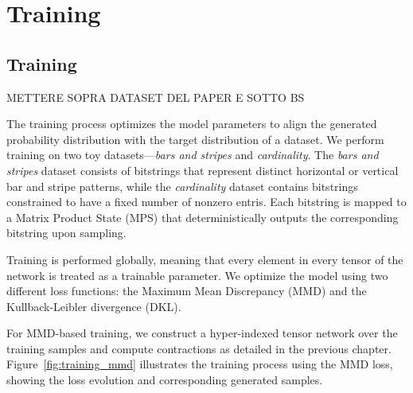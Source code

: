 \chapter{Training}

\section{Training}

METTERE SOPRA DATASET DEL PAPER E SOTTO BS

The training process optimizes the model parameters to align the generated probability distribution with the target distribution of a dataset. We perform training on two toy datasets—\emph{bars and stripes} and \emph{cardinality}. The \emph{bars and stripes} dataset consists of bitstrings that represent distinct horizontal or vertical bar and stripe patterns, while the \emph{cardinality} dataset contains bitstrings constrained to have a fixed number of nonzero entris. Each bitstring is mapped to a Matrix Product State (MPS) that deterministically outputs the corresponding bitstring upon sampling.

Training is performed globally, meaning that every element in every tensor of the network is treated as a trainable parameter. We optimize the model using two different loss functions: the Maximum Mean Discrepancy (MMD) and the Kullback-Leibler divergence (DKL). 

For MMD-based training, we construct a hyper-indexed tensor network over the training samples and compute contractions as detailed in the previous chapter. Figure~\ref{fig:training_mmd} illustrates the training process using the MMD loss, showing the loss evolution and corresponding generated samples.

